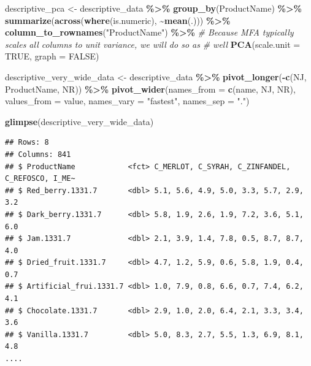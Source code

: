 \documentclass[
]{book}
\newenvironment{Shaded}{\begin{snugshade}}{\end{snugshade}}
\newcommand{\AttributeTok}[1]{\textcolor[rgb]{0.13,0.29,0.53}{#1}}
\newcommand{\CommentTok}[1]{\textcolor[rgb]{0.56,0.35,0.01}{\textit{#1}}}
\newcommand{\ConstantTok}[1]{\textcolor[rgb]{0.56,0.35,0.01}{#1}}
\newcommand{\FunctionTok}[1]{\textcolor[rgb]{0.13,0.29,0.53}{\textbf{#1}}}
\newcommand{\NormalTok}[1]{#1}
\newcommand{\OtherTok}[1]{\textcolor[rgb]{0.56,0.35,0.01}{#1}}
\newcommand{\SpecialCharTok}[1]{\textcolor[rgb]{0.81,0.36,0.00}{\textbf{#1}}}
\newcommand{\StringTok}[1]{\textcolor[rgb]{0.31,0.60,0.02}{#1}}
\begin{document}
\begin{Shaded}
\begin{Highlighting}[]
\NormalTok{descriptive\_pca }\OtherTok{\textless{}{-}} 
\NormalTok{  descriptive\_data }\SpecialCharTok{\%\textgreater{}\%}
  \FunctionTok{group\_by}\NormalTok{(ProductName) }\SpecialCharTok{\%\textgreater{}\%}
  \FunctionTok{summarize}\NormalTok{(}\FunctionTok{across}\NormalTok{(}\FunctionTok{where}\NormalTok{(is.numeric), }\SpecialCharTok{\textasciitilde{}}\FunctionTok{mean}\NormalTok{(.))) }\SpecialCharTok{\%\textgreater{}\%}
  \FunctionTok{column\_to\_rownames}\NormalTok{(}\StringTok{"ProductName"}\NormalTok{) }\SpecialCharTok{\%\textgreater{}\%}
  \CommentTok{\# Because MFA typically scales all columns to unit variance, we will do so as}
  \CommentTok{\# well}
  \FunctionTok{PCA}\NormalTok{(}\AttributeTok{scale.unit =} \ConstantTok{TRUE}\NormalTok{, }\AttributeTok{graph =} \ConstantTok{FALSE}\NormalTok{)}

\NormalTok{descriptive\_very\_wide\_data }\OtherTok{\textless{}{-}} 
\NormalTok{  descriptive\_data }\SpecialCharTok{\%\textgreater{}\%}
  \FunctionTok{pivot\_longer}\NormalTok{(}\SpecialCharTok{{-}}\FunctionTok{c}\NormalTok{(NJ, ProductName, NR)) }\SpecialCharTok{\%\textgreater{}\%}
  \FunctionTok{pivot\_wider}\NormalTok{(}\AttributeTok{names\_from =} \FunctionTok{c}\NormalTok{(name, NJ, NR), }
              \AttributeTok{values\_from =}\NormalTok{ value, }
              \AttributeTok{names\_vary =} \StringTok{"fastest"}\NormalTok{, }
              \AttributeTok{names\_sep =} \StringTok{"."}\NormalTok{)}

\FunctionTok{glimpse}\NormalTok{(descriptive\_very\_wide\_data)}
\end{Highlighting}
\end{Shaded}

\begin{verbatim}
## Rows: 8
## Columns: 841
## $ ProductName            <fct> C_MERLOT, C_SYRAH, C_ZINFANDEL, C_REFOSCO, I_ME~
## $ Red_berry.1331.7       <dbl> 5.1, 5.6, 4.9, 5.0, 3.3, 5.7, 2.9, 3.2
## $ Dark_berry.1331.7      <dbl> 5.8, 1.9, 2.6, 1.9, 7.2, 3.6, 5.1, 6.0
## $ Jam.1331.7             <dbl> 2.1, 3.9, 1.4, 7.8, 0.5, 8.7, 8.7, 4.0
## $ Dried_fruit.1331.7     <dbl> 4.7, 1.2, 5.9, 0.6, 5.8, 1.9, 0.4, 0.7
## $ Artificial_frui.1331.7 <dbl> 1.0, 7.9, 0.8, 6.6, 0.7, 7.4, 6.2, 4.1
## $ Chocolate.1331.7       <dbl> 2.9, 1.0, 2.0, 6.4, 2.1, 3.3, 3.4, 3.6
## $ Vanilla.1331.7         <dbl> 5.0, 8.3, 2.7, 5.5, 1.3, 6.9, 8.1, 4.8
....
\end{verbatim}
\end{document}
